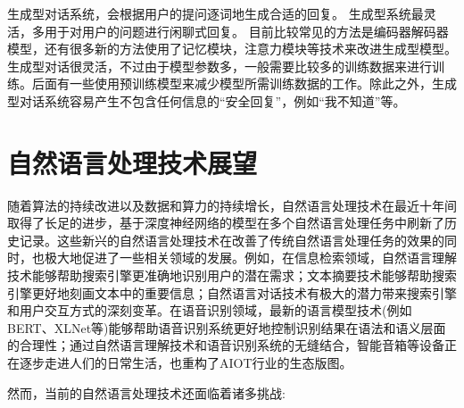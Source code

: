 \documentclass[graybox,envcountchap,sectrefs]{svmono}
\begin{document}
生成型对话系统\citep{sutskever2014sequence,shang2015neural,serban2016building,serban2016hierarchical}，会根据用户的提问逐词地生成合适的回复。
生成型系统最灵活，多用于对用户的问题进行闲聊式回复。
目前比较常见的方法是编码器解码器模型，还有很多新的方法使用了记忆模块，注意力模块等技术来改进生成型模型。
生成型对话很灵活，不过由于模型参数多，一般需要比较多的训练数据来进行训练。后面有一些使用预训练模型来减少模型所需训练数据的工作。除此之外，生成型对话系统容易产生不包含任何信息的``安全回复''，例如``我不知道''等。




\section{自然语言处理技术展望}

随着算法的持续改进以及数据和算力的持续增长，自然语言处理技术在最近十年间取得了长足的进步，基于深度神经网络的模型在多个自然语言处理任务中刷新了历史记录。这些新兴的自然语言处理技术在改善了传统自然语言处理任务的效果的同时，也极大地促进了一些相关领域的发展。例如，在信息检索领域，自然语言理解技术能够帮助搜索引擎更准确地识别用户的潜在需求；文本摘要技术能够帮助搜索引擎更好地刻画文本中的重要信息；自然语言对话技术有极大的潜力带来搜索引擎和用户交互方式的深刻变革。在语音识别领域，最新的语言模型技术(例如BERT、XLNet等\cite{devlin2018bert, yang2019xlnet, song2019topic})能够帮助语音识别系统更好地控制识别结果在语法和语义层面的合理性；通过自然语言理解技术和语音识别系统的无缝结合，智能音箱等设备正在逐步走进人们的日常生活，也重构了AIOT行业的生态版图。

然而，当前的自然语言处理技术还面临着诸多挑战:
\end{document}
